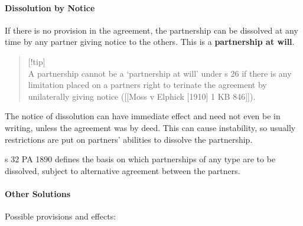 \documentclass[
]{article}
\begin{document}
\hypertarget{dissolution-by-notice}{%
\paragraph{Dissolution by Notice}\label{dissolution-by-notice}}

If there is no provision in the agreement, the partnership can be
dissolved at any time by any partner giving notice to the others. This
is a \textbf{partnership at will}.

\begin{quote}
{[}!tip{]}\\
A partnership cannot be a `partnership at will' under s 26 if there is
any limitation placed on a partners right to terinate the agreement by
unilaterally giving notice ({[}{[}Moss v Elphick {[}1910{]} 1 KB
846{]}{]}).
\end{quote}

The notice of dissolution can have immediate effect and need not even be
in writing, unless the agreement was by deed. This can cause
instability, so usually restrictions are put on partners' abilities to
dissolve the partnership.

s 32 PA 1890 defines the basis on which partnerships of any type are to
be dissolved, subject to alternative agreement between the partners.

\hypertarget{other-solutions}{%
\paragraph{Other Solutions}\label{other-solutions}}

Possible provisions and effects:
\end{document}
